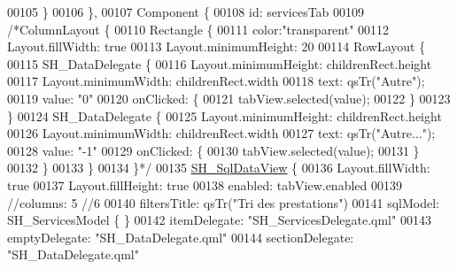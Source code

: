 \begin{DoxyCode}
00105             \}
00106         \},
00107         Component \{
00108             \textcolor{keywordtype}{id}: servicesTab
00109             \textcolor{comment}{/*ColumnLayout \{}
00110 \textcolor{comment}{                Rectangle \{}
00111 \textcolor{comment}{                    color:"transparent"}
00112 \textcolor{comment}{                    Layout.fillWidth: true}
00113 \textcolor{comment}{                    Layout.minimumHeight: 20}
00114 \textcolor{comment}{                    RowLayout \{}
00115 \textcolor{comment}{                        SH\_DataDelegate \{}
00116 \textcolor{comment}{                            Layout.minimumHeight: childrenRect.height}
00117 \textcolor{comment}{                            Layout.minimumWidth: childrenRect.width}
00118 \textcolor{comment}{                            text: qsTr("Autre");}
00119 \textcolor{comment}{                            value: "0"}
00120 \textcolor{comment}{                            onClicked: \{}
00121 \textcolor{comment}{                                tabView.selected(value);}
00122 \textcolor{comment}{                            \}}
00123 \textcolor{comment}{                        \}}
00124 \textcolor{comment}{                        SH\_DataDelegate \{}
00125 \textcolor{comment}{                            Layout.minimumHeight: childrenRect.height}
00126 \textcolor{comment}{                            Layout.minimumWidth: childrenRect.width}
00127 \textcolor{comment}{                            text: qsTr("Autre...");}
00128 \textcolor{comment}{                            value: "-1"}
00129 \textcolor{comment}{                            onClicked: \{}
00130 \textcolor{comment}{                                tabView.selected(value);}
00131 \textcolor{comment}{                            \}}
00132 \textcolor{comment}{                        \}}
00133 \textcolor{comment}{                    \}}
00134 \textcolor{comment}{                \}*/}
00135             \hyperlink{classSH__SqlDataView}{SH\_SqlDataView} \{
00136                 Layout.fillWidth: \textcolor{keyword}{true}
00137                 Layout.fillHeight: \textcolor{keyword}{true}
00138                 enabled: tabView.enabled
00139                 \textcolor{comment}{//columns: 5 //6}
00140                 filtersTitle: qsTr(\textcolor{stringliteral}{"Tri des prestations"})
00141                 sqlModel: SH\_ServicesModel \{ \}
00142                 itemDelegate: \textcolor{stringliteral}{"SH\_ServicesDelegate.qml"}
00143                 emptyDelegate: \textcolor{stringliteral}{"SH\_DataDelegate.qml"}
00144                 sectionDelegate: \textcolor{stringliteral}{"SH\_DataDelegate.qml"}

\end{DoxyCode}
